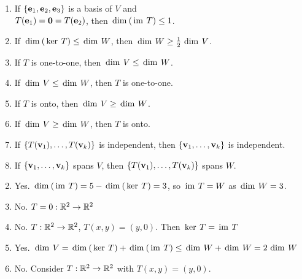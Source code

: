 \begin{multicols}{2}
\begin{ex}
\begin{enumerate}[label={\alph*.}]
\item If $\{\vect{e}_{1}, \vect{e}_{2}, \vect{e}_{3}\}$ is a basis of $V$ and \\ $T(\vect{e}_{1}) = \vect{0} = T(\vect{e}_{2})$, then $\func{dim}(\func{im }T) \leq 1$.

\item If $\func{dim}(\func{ker }T) \leq \func{dim }W$, then $\func{dim }W \geq \frac{1}{2} \func{dim }V$.

\item If $T$ is one-to-one, then $\func{dim }V \leq \func{dim }W$.

\item If $\func{dim }V \leq \func{dim }W$, then $T$ is one-to-one.

\item If $T$ is onto, then $\func{dim }V \geq \func{dim }W$.

\item If $\func{dim }V \geq \func{dim }W$, then $T$ is onto.

\item If $\{T(\vect{v}_{1}), \dots, T(\vect{v}_{k})\}$ is independent, then $\{\vect{v}_{1}, \dots, \vect{v}_{k}\}$ is independent.

\item If $\{\vect{v}_{1}, \dots, \vect{v}_{k}\}$ spans $V$, then $\{T(\vect{v}_{1}), \dots, T(\vect{v}_{k})\}$ spans $W$.

\end{enumerate}
\begin{sol}
\begin{enumerate}[label={\alph*.}]
\setcounter{enumi}{1}
\item  Yes. $\func{dim}(\func{im }T) = 5 - \func{dim}(\func{ker }T) = 3$, so $\func{im }T = W$ as $\func{dim }W = 3$.

\setcounter{enumi}{3}
\item  No. $T = 0: \RR^2 \to \RR^2$

\setcounter{enumi}{5}
\item  No. $T : \RR^2 \to \RR^2$, $T(x, y) = (y, 0)$. Then $\func{ker }T = \func{im }T$

\setcounter{enumi}{7}
\item  Yes. $\func{dim }V = \func{dim}(\func{ker }T) + \func{dim}(\func{im }T) \leq \func{dim }W + \func{dim }W = 2 \func{dim }W$

\setcounter{enumi}{9}
\item  No. Consider $T : \RR^2 \to \RR^2$ with $T(x, y) = (y, 0)$.


\end{enumerate}
\end{sol}
\end{ex}
\end{multicols}
